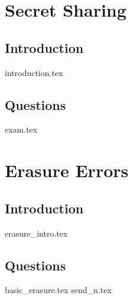 \documentclass{exam}
\begin{document}
\section{Secret Sharing}
\subsection{Introduction}
{introduction.tex}
\subsection{Questions}
\begin{questions}
	{exam.tex}
\end{questions}

\section{Erasure Errors}
\subsection{Introduction}
{erasure_intro.tex}
\subsection{Questions}
\begin{questions}
{basic_erasure.tex}
{send_n.tex}
\end{questions}
\end{document}
